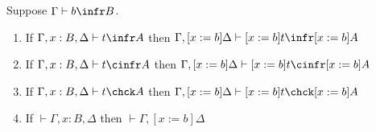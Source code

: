\begin{lemma}
    Suppose $\Gamma \vdash b \infr B$.
    \begin{enumerate}
        \item If $\Gamma, x : B, \Delta \vdash t \infr A$ then $\Gamma, [x := b]\Delta \vdash [x := b]t \infr [x := b]A$
        \item If $\Gamma, x : B, \Delta \vdash t \cinfr A$ then $\Gamma, [x := b]\Delta \vdash [x := b]t \cinfr [x := b]A$
        \item If $\Gamma, x : B, \Delta \vdash t \chck A$ then $\Gamma, [x := b]\Delta \vdash [x := b]t \chck [x := b]A$
        \item If $\vdash \Gamma, x : B, \Delta$ then $\vdash \Gamma, [x := b]\Delta$
    \end{enumerate}
    \label{lem:2:subst_infer}
\end{lemma}
